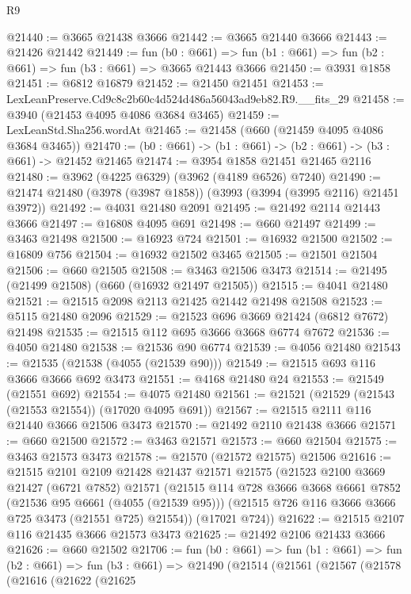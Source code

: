 \begin{lexlean}{R9}
\begin{coremodule}
@21440 := @3665 @21438 @3666
@21442 := @3665 @21440 @3666
@21443 := @21426 @21442
@21449 := fun (b0 : @661) =>
  fun (b1 : @661) => fun (b2 : @661) => fun (b3 : @661) => @3665 @21443 @3666
@21450 := @3931 @1858
@21451 := @6812 @16879
@21452 := @21450 @21451
@21453 := LexLeanPreserve.Cd9c8c2b60c4d524d486a56043ad9eb82.R9.__fits_29
@21458 := @3940 (@21453 @4095 @4086 @3684 @3465)
@21459 := LexLeanStd.Sha256.wordAt
@21465 := @21458 (@660 (@21459 @4095 @4086 @3684 @3465))
@21470 := (b0 : @661) -> (b1 : @661) -> (b2 : @661) -> (b3 : @661) -> @21452 @21465
@21474 := @3954 @1858 @21451 @21465 @2116
@21480 := @3962 (@4225 @6329) (@3962 (@4189 @6526) @7240)
@21490 := @21474 @21480 (@3978 (@3987 @1858)) (@3993 (@3994 (@3995 @2116) @21451 @3972))
@21492 := @4031 @21480 @2091
@21495 := @21492 @2114 @21443 @3666
@21497 := @16808 @4095 @691
@21498 := @660 @21497
@21499 := @3463 @21498
@21500 := @16923 @724
@21501 := @16932 @21500
@21502 := @16809 @756
@21504 := @16932 @21502 @3465
@21505 := @21501 @21504
@21506 := @660 @21505
@21508 := @3463 @21506 @3473
@21514 := @21495 (@21499 @21508) (@660 (@16932 @21497 @21505))
@21515 := @4041 @21480
@21521 := @21515 @2098 @2113 @21425 @21442 @21498 @21508
@21523 := @5115 @21480 @2096
@21529 := @21523 @696 @3669 @21424 (@6812 @7672) @21498
@21535 := @21515 @112 @695 @3666 @3668 @6774 @7672
@21536 := @4050 @21480
@21538 := @21536 @90 @6774
@21539 := @4056 @21480
@21543 := @21535 (@21538 (@4055 (@21539 @90)))
@21549 := @21515 @693 @116 @3666 @3666 @692 @3473
@21551 := @4168 @21480 @24
@21553 := @21549 (@21551 @692)
@21554 := @4075 @21480
@21561 := @21521 (@21529 (@21543 (@21553 @21554)) (@17020 @4095 @691))
@21567 := @21515 @2111 @116 @21440 @3666 @21506 @3473
@21570 := @21492 @2110 @21438 @3666
@21571 := @660 @21500
@21572 := @3463 @21571
@21573 := @660 @21504
@21575 := @3463 @21573 @3473
@21578 := @21570 (@21572 @21575) @21506
@21616 := @21515
    @2101
    @2109
    @21428
    @21437
    @21571
    @21575
    (@21523
      @2100
      @3669
      @21427
      (@6721 @7852)
      @21571
      (@21515
        @114
        @728
        @3666
        @3668
        @6661
        @7852
        (@21536 @95 @6661 (@4055 (@21539 @95)))
        (@21515 @726 @116 @3666 @3666 @725 @3473 (@21551 @725) @21554))
      (@17021 @724))
@21622 := @21515 @2107 @116 @21435 @3666 @21573 @3473
@21625 := @21492 @2106 @21433 @3666
@21626 := @660 @21502
@21706 := fun (b0 : @661) =>
  fun (b1 : @661) =>
  fun (b2 : @661) =>
  fun (b3 : @661) =>
  @21490
    (@21514
      (@21561
        (@21567
          (@21578
            (@21616
              (@21622
                (@21625

\end{coremodule}
\end{lexlean}
